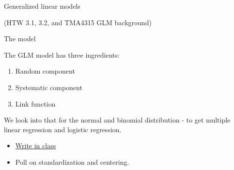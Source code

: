 \documentclass[
  ignorenonframetext,
]{beamer}
\providecommand{\tightlist}{%
  \setlength{\itemsep}{0pt}\setlength{\parskip}{0pt}}
\begin{document}
\begin{frame}

\end{frame}

\begin{frame}{Generalized linear models}
\protect\hypertarget{generalized-linear-models}{}

(HTW 3.1, 3.2, and TMA4315 GLM background)

\begin{block}{The model}

The GLM model has three ingredients:

\begin{enumerate}
[1)]
\tightlist
\item
  Random component
\item
  Systematic component
\item
  Link function
\end{enumerate}

We look into that for the normal and binomial distribution - to get
multiple linear regression and logistic regression.

\begin{itemize}
\tightlist
\item
  \href{classnotelink}{Write in class}
\item
  Poll on standardization and centering.
\end{itemize}

\end{block}

\end{frame}

\begin{frame}

\end{frame}
\end{document}

